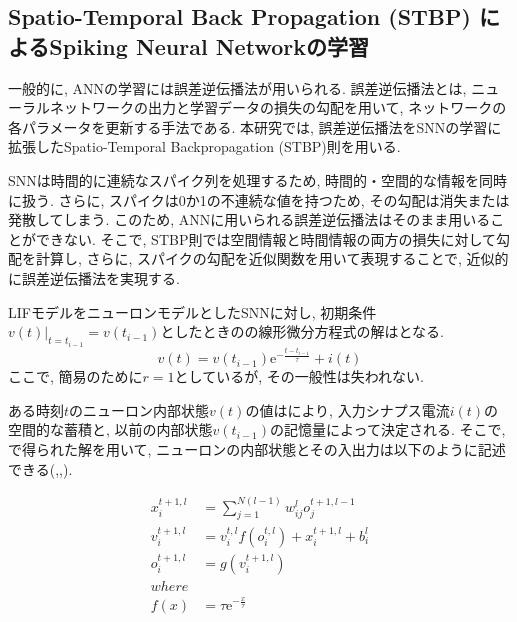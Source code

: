 \subsection{Spatio-Temporal Back Propagation (STBP) によるSpiking Neural Networkの学習}

一般的に, ANNの学習には誤差逆伝播法が用いられる.
誤差逆伝播法とは, ニューラルネットワークの出力と学習データの損失の勾配を用いて, ネットワークの各パラメータを更新する手法である.
本研究では, 誤差逆伝播法をSNNの学習に拡張したSpatio-Temporal Backpropagation (STBP)則\cite{stbp}を用いる.

SNNは時間的に連続なスパイク列を処理するため, 時間的・空間的な情報を同時に扱う.
さらに, スパイクは0か1の不連続な値を持つため, その勾配は消失または発散してしまう.
このため, ANNに用いられる誤差逆伝播法はそのまま用いることができない\cite{stbpref}.
そこで, STBP則では空間情報と時間情報の両方の損失に対して勾配を計算し, さらに, スパイクの勾配を近似関数を用いて表現することで, 近似的に誤差逆伝播法を実現する.

LIFモデルをニューロンモデルとしたSNNに対し, 初期条件$v(t)|_{t=t_{i-1}}=v(t_{i-1})$としたときのの線形微分方程式の解はとなる.
\begin{equation}
    v(t) = v \left(t_{i-1}\right) \mathrm{e}^{-\frac{t-t_{i-1}}{\tau}} + i(t)
    \label{eq:snn:lif:diff}
\end{equation}
ここで, 簡易のために$r=1$としているが, その一般性は失われない.

ある時刻$t$のニューロン内部状態$v(t)$の値はにより, 入力シナプス電流$i(t)$の空間的な蓄積と, 以前の内部状態$v(t_{i-1})$の記憶量によって決定される.
そこで, で得られた解を用いて, ニューロンの内部状態とその入出力は以下のように記述できる(,,).

\begin{align}
    x_i^{t+1,l} &= \sum_{j=1}^{N(l-1)} w_{ij}^{l} o_j^{t+1,l-1} \label{eq:snn:lif:state} \\
    v_i^{t+1,l} &= v_i^{t,l} f\left(o_i^{t,l}\right) + x_i^{t+1,l} + b_i^l \label{eq:snn:lif:state2} \\
    o_i^{t+1,l} &= g\left(v_i^{t+1,l}\right) \label{eq:snn:lif:state3}\\
    where\\
    f\left(x\right) &= \tau \mathrm{e}^{-\frac{x}{\tau}} \label{eq:snn:lif:state4}
\end{align}


